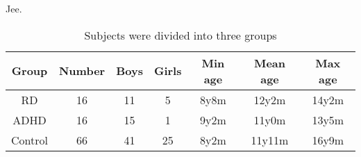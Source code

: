 Jee.

\begin{table}
\centering
\begin{tabular}{c c c c c c c}

\textbf{Group} & \textbf{Number} & \textbf{Boys} & \textbf{Girls} & \textbf{Min age} & \textbf{Mean age} & \textbf{Max age} \\ \hline
RD      & 16 & 11 & 5  & 8y8m & 12y2m  & 14y2m \\
ADHD    & 16 & 15 & 1  & 9y2m & 11y0m  & 13y5m \\
Control & 66 & 41 & 25 & 8y2m & 11y11m & 16y9m \\

\end{tabular}
\caption{Subjects were divided into three groups}
\label{SUBJECTS}
\end{table}
